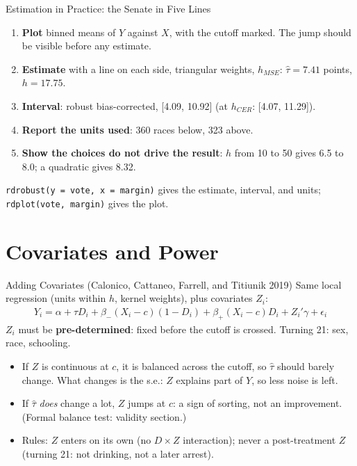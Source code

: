 \documentclass[aspectratio=169,11pt,xcolor=dvipsnames]{beamer}
\newcommand{\srcp}[1]{{\scriptsize\color{gray}(#1)}}
\newcommand{\core}{\,\raisebox{0.6pt}{\textcolor{corestar}{$\bigstar$}}}
\begin{document}
\begin{frame}{Estimation in Practice: the Senate in Five Lines\core}
\begin{enumerate}\itemsep5pt
  \item \textbf{Plot} binned means of $Y$ against $X$, with the cutoff marked.
        The jump should be visible before any estimate.
  \item \textbf{Estimate} with a line on each side, triangular weights,
        $h_{MSE}$: $\hat\tau = 7.41$ points, $h = 17.75$.
  \item \textbf{Interval}: robust bias-corrected, [4.09, 10.92] (at $h_{CER}$:
        [4.07, 11.29]).
  \item \textbf{Report the units used}: 360 races below, 323 above.
  \item \textbf{Show the choices do not drive the result}: $h$ from 10 to 50
        gives 6.5 to 8.0; a quadratic gives 8.32.
\end{enumerate}
\vskip6pt
\texttt{rdrobust(y = vote, x = margin)} gives the estimate, interval, and units;
\texttt{rdplot(vote, margin)} gives the plot.
\end{frame}

\section[Covariates]{Covariates and Power}
\begin{frame}\sectionpage\end{frame}

\begin{frame}{Adding Covariates \srcp{Calonico, Cattaneo, Farrell, and Titiunik 2019}}
Same local regression (units within $h$, kernel weights), plus covariates $Z_i$:
\begin{align*}
  Y_i = \alpha + \tau D_i + \beta_-(X_i - c)(1 - D_i) + \beta_+(X_i - c)D_i
        + Z_i'\gamma + \epsilon_i
\end{align*}
$Z_i$ must be \textbf{pre-determined}: fixed before the cutoff is crossed.
Turning 21: sex, race, schooling.
\vskip3pt
\begin{itemize}\itemsep3pt
  \item If $Z$ is continuous at $c$, it is balanced across the cutoff, so
        \alert{$\hat\tau$ should barely change}. What changes is the s.e.: $Z$
        explains part of $Y$, so less noise is left.
  \item If $\hat\tau$ \emph{does} change a lot, $Z$ jumps at $c$: a sign of sorting,
        not an improvement. (Formal balance test: validity section.)
  \item Rules: $Z$ enters on its own (no $D \times Z$ interaction); never a
        post-treatment $Z$ (turning 21: not drinking, not a later arrest).
\end{itemize}
\end{frame}
\end{document}
